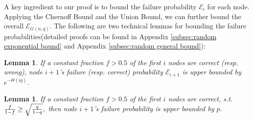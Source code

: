 \documentclass[a4paper,UKenglish]{lipics}
\newtheorem{lem}[thm]{Lemma}
\theoremstyle{definition}
\begin{document}
A key ingredient to our proof is to bound the failure probability $\mathcal{E}_i$ for each node. Applying the Chernoff Bound and the Union Bound, we can further bound the overall $\mathcal{E}_{G(n,q)}$. The following are two technical lemmas for bounding the failure probabilities(detailed proofs can be found in Appendix \ref{subsec:random exponential bound} and Appendix \ref{subsec:random general bound}):

\begin{lem} 
\label {lem:random exponential bound}
If a constant fraction $f > 0.5$ of the first $i$ nodes are correct (resp. wrong), 
	node $i+1$'s failure (resp. correct) probability $\mathcal{E}_{i+1}$ is upper bounded by $e^{-\Theta(iq)}$. 
\end{lem}

%

\begin{lem}
\label {lem:random general bound}
If a constant fraction $f > 0.5$ of the first $i$ nodes are correct, s.t.
$
	{f\over 1-f} \ge \sqrt{q\over 1-q},
$
then node $i+1$'s failure probability is upper bounded by $p$. 
\end{lem}

\end{document}

